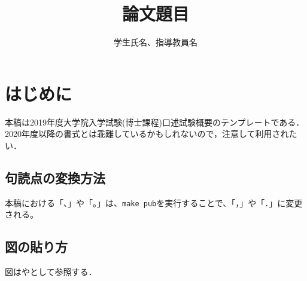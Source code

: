 \documentclass[twocolumn]{d-abst}
\title{論文題目}
\author{学生氏名、指導教員名}
\begin{document}
\pagestyle{empty}
\maketitle
\thispagestyle{empty}
\sloppy

\section{はじめに}

本稿は2019年度大学院入学試験(博士課程)口述試験概要のテンプレートである．
2020年度以降の書式とは乖離しているかもしれないので，注意して利用されたい．

\subsection{句読点の変換方法}

本稿における「、」や「。」は、\verb|make pub|を実行することで、「，」や「．」に変更される。

\subsection{図の貼り方}

図はやとして参照する．
\end{document}
